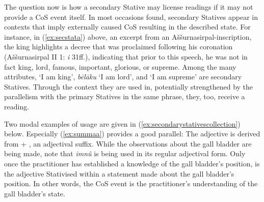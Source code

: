 \documentclass[output=paper,colorlinks,citecolor=brown]{langscibook}
\begin{document}
 The question now is how a secondary Stative may license  readings if it may not provide a CoS  event itself. In most occasions found, secondary Statives appear in contexts that imply externally caused CoS  resulting in the described state. For instance, in (\ref{ex:secstata}) above, an excerpt from an Aššurnasirpal-inscription, the king highlights a decree that was proclaimed following his coronation (Aššurnasirpal II 1: \textit{i} 31ff.), indicating that prior to this speech, he was not in fact king, lord, famous, important, glorious, or supreme. Among the many attributes,  `I am king', \textit{bēlāku} `I am lord', and  `I am supreme' are secondary Statives. Through the context they are used in, potentially strengthened by the parallelism with the primary Statives  in the same phrase, they, too, receive a  reading.

Two modal examples of usage are given in (\ref{ex:secondarystativescollection}) below. Especially (\ref{ex:summaa}) provides a good parallel: The adjective  is derived from  + , an adjectival suffix. While the observations about the gall bladder are being made, note that \textit{imnû} is being used in its regular adjectival form. Only once the practitioner has established a knowledge of the gall bladder's position, is the adjective Stativised within a statement made about the gall bladder's position. In other words, the CoS event is the practitioner's understanding of the gall bladder's state.
\end{document}
